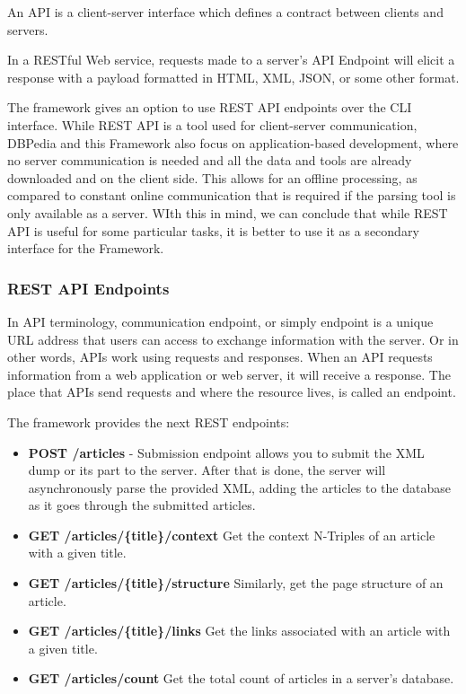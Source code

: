 \documentclass[thesis=M,english,hidelinks]{FITthesis}[2019/12/23]
\begin{document}
An \gls{API} is a client-server interface which defines a contract between clients and servers.

In a RESTful Web service, requests made to a server's API Endpoint will elicit a response with a payload formatted in HTML, XML, JSON, or some other format.

The framework gives an option to use REST API endpoints over the CLI interface. While REST API is a tool used for client-server communication, DBPedia and this Framework also focus on application-based development, where no server communication is needed and all the data and tools are already downloaded and on the client side. This allows for an offline processing, as compared to constant online communication that is required if the parsing tool is only available as a server. WIth this in mind, we can conclude that while \gls{REST} \gls{API} is useful for some particular tasks, it is better to use it as a secondary interface for the Framework.

\subsubsection{REST API Endpoints}

In \gls{API} terminology, communication endpoint, or simply endpoint is a unique URL address that users can access to exchange information with the server. Or in other words, APIs work using requests and responses. When an API requests information from a web application or web server, it will receive a response. The place that APIs send requests and where the resource lives, is called an endpoint\cite{REST_Design}. 

The framework provides the next \gls{REST} endpoints:

\begin{itemize}
	\item \textbf{POST /articles} - Submission endpoint allows you to submit the XML dump or its part to the server. After that is done, the server will asynchronously parse the provided XML, adding the articles to the database as it goes through the submitted articles.
	\item \textbf{GET /articles/\{title\}/context} Get the context N-Triples of an article with a given title.
	\item \textbf{GET /articles/\{title\}/structure} Similarly, get the page structure of an article.
	\item \textbf{GET /articles/\{title\}/links} Get the links associated with an article with a given title.
	\item \textbf{GET /articles/count} Get the total count of articles in a server's database.
\end{itemize}
\end{document}
